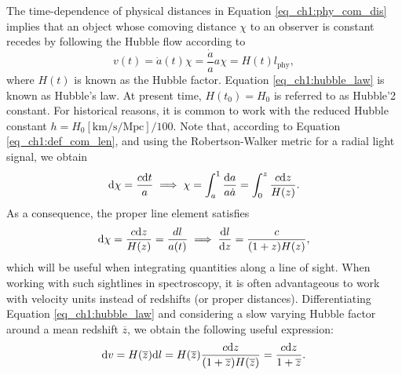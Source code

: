 The time-dependence of physical distances in Equation \ref{eq_ch1:phy_com_dis} implies that an object whose comoving distance $\chi$ to an observer is constant recedes by following the Hubble flow according to
\begin{equation}\label{eq_ch1:hubble_law}
    v(t)=\dot{a}(t)\chi=\frac{\dot{a}}{a}a\chi=H(t)l_\text{phy},
\end{equation}
where $H(t)$ is known as the Hubble factor. Equation \ref{eq_ch1:hubble_law} is known as Hubble's law. At present time, $H(t_0)=H_0$ is referred to as Hubble'2 constant. For historical reasons, it is common to work with the reduced Hubble constant $h=H_0 [\text{km/s/Mpc}]/100$.
Note that, according to Equation \ref{eq_ch1:def_com_len}, and using the Robertson-Walker metric for a radial light signal, we obtain
\begin{equation}
    \differential \chi=\frac{c\differential t}{a}\implies \chi=\int_a^1\frac{\differential a}{a \dot{a}}=\int_0^z\frac{c \differential z}{H(z)}.
\end{equation}
As a consequence, the proper line element satisfies
\begin{equation}\label{eq_ch1:dl_over_dz}
    \differential \chi =\frac{c\differential z}{H(z)}=\frac{dl}{a(t)} \implies \frac{\differential l}{\differential z}=\frac{c}{(1+z)H(z)},
\end{equation}
which will be useful when integrating quantities along a line of sight. When working with such sightlines in spectroscopy, it is often advantageous to work with velocity units instead of redshifts (or proper distances). Differentiating Equation \ref{eq_ch1:hubble_law} and considering a slow varying Hubble factor around a mean redshift $\overline{z}$, we obtain the following useful expression:
\begin{equation}
    \differential v=H(\overline{z})\differential l=H(\overline{z})\frac{c\differential z}{(1+\overline{z})H(\overline{z})}=\frac{c\differential z}{1+\overline{z}}.
\end{equation}

